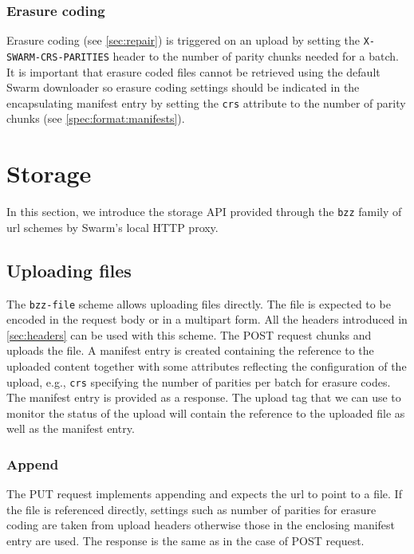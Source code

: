 \subsubsection{Erasure coding}

Erasure coding (see \ref{sec:repair}) is triggered on an upload by setting the \texttt{X-SWARM-CRS-PARITIES} header to the number of parity chunks needed for a batch. It is important that erasure coded files cannot be retrieved using the default Swarm downloader so erasure coding settings should be indicated in the encapsulating manifest entry by setting the \texttt{crs} attribute to the number of parity chunks (see \ref{spec:format:manifests}). 

\section{Storage}\label{sec:storage-ux}

\green{}


In this section, we introduce the storage API provided through the \texttt{bzz} family of url schemes by Swarm's local HTTP proxy.

\subsection{Uploading files}\label{sec:file-api}

The \texttt{bzz-file} scheme allows uploading files directly. The file is expected to be encoded in the request body or in a multipart form. All the headers introduced  in \ref{sec:headers} can be used with this scheme. The POST request chunks and uploads the file. A manifest entry is created containing the reference to the uploaded content together with some attributes reflecting the configuration of the upload, e.g., \texttt{crs} specifying the number of parities per batch for erasure codes.
The manifest entry is provided as a response. The upload tag that we can use to monitor the status of the  upload  will contain the reference to the uploaded file as well as the manifest entry.

\subsubsection{Append}\label{sec:append}

The PUT request implements appending and expects the url to point to a file. If the file is referenced directly, settings such as number of parities for erasure coding are taken from upload headers otherwise those in the enclosing manifest entry are used. The response is the same as in the case of POST request.


